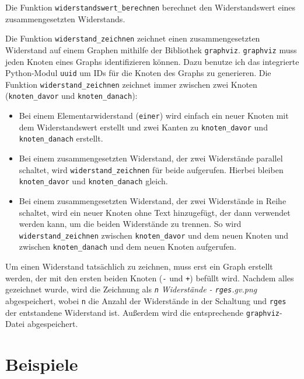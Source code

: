 \documentclass[a4paper,10pt,ngerman]{scrartcl}
\begin{document}
Die Funktion \texttt{widerstandswert\_berechnen} berechnet den Widerstandswert eines zusammengesetzten Widerstands.

Die Funktion \texttt{widerstand\_zeichnen} zeichnet einen zusammengesetzten Widerstand auf einem Graphen mithilfe der Bibliothek \texttt{graphviz}. \texttt{graphviz} muss jeden Knoten eines Graphs identifizieren können. Dazu benutze ich das integrierte Python-Modul \texttt{uuid} um IDs für die Knoten des Graphs zu generieren. Die Funktion \texttt{widerstand\_zeichnen} zeichnet immer zwischen zwei Knoten (\texttt{knoten\_davor} und \texttt{knoten\_danach}):
\begin{itemize}
  \item Bei einem Elementarwiderstand (\texttt{einer}) wird einfach ein neuer Knoten mit dem Widerstandswert erstellt und zwei Kanten zu \texttt{knoten\_davor} und \texttt{knoten\_danach} erstellt.
  \item Bei einem zusammengesetzten Widerstand, der zwei Widerstände parallel schaltet, wird \texttt{widerstand\_zeichnen} für beide aufgerufen. Hierbei bleiben \texttt{knoten\_davor} und \texttt{knoten\_danach} gleich.
  \item Bei einem zusammengesetzten Widerstand, der zwei Widerstände in Reihe schaltet, wird ein neuer Knoten ohne Text hinzugefügt, der dann verwendet werden kann, um die beiden Widerstände zu trennen. So wird \texttt{widerstand\_zeichnen} zwischen \texttt{knoten\_davor} und dem neuen Knoten und zwischen \texttt{knoten\_danach} und dem neuen Knoten aufgerufen.
\end{itemize}
Um einen Widerstand tatsächlich zu zeichnen, muss erst ein Graph erstellt werden, der mit den ersten beiden Knoten (\texttt{-} und \texttt{+}) befüllt wird. Nachdem alles gezeichnet wurde, wird die Zeichnung als \textit{\texttt{n} Widerstände - \texttt{rges}.gv.png} abgespeichert, wobei \texttt{n} die Anzahl der Widerstände in der Schaltung und \texttt{rges} der entstandene Widerstand ist. Außerdem wird die entsprechende \texttt{graphviz}-Datei abgespeichert.

\section{Beispiele}

\newcommand{\widerstand}[4]{
  \begin{figure}[H]
    \centering
    \texttt{[image: beispiele/beispiel\#1-\#3]}
    \caption{#2$\Omega$ - #3 \ifnum#3<2 Widerstand \else Widerstände \fi (#4$\Omega$)} 
  \end{figure}
}
\end{document}

